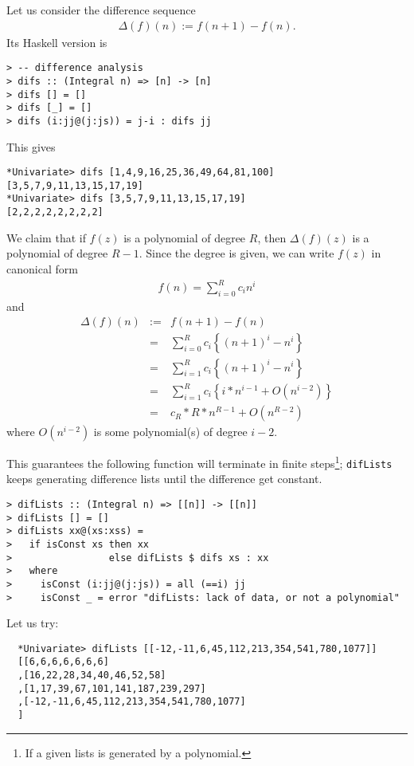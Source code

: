 \documentclass[11pt]{book}
\begin{document}
Let us consider the difference sequence
\begin{eqnarray}
\label{difference}
\Delta(f) (n) := f(n+1) - f(n).
\end{eqnarray}
Its Haskell version is
\begin{verbatim}
> -- difference analysis
> difs :: (Integral n) => [n] -> [n]
> difs [] = []
> difs [_] = []
> difs (i:jj@(j:js)) = j-i : difs jj
\end{verbatim}
This gives
\begin{verbatim}
*Univariate> difs [1,4,9,16,25,36,49,64,81,100]
[3,5,7,9,11,13,15,17,19]
*Univariate> difs [3,5,7,9,11,13,15,17,19]
[2,2,2,2,2,2,2,2]
\end{verbatim}

We claim that if $f(z)$ is a polynomial of degree $R$, then $\Delta(f)(z)$ is a polynomial of degree $R-1$.
Since the degree is given, we can write $f(z)$ in canonical form
\begin{eqnarray}
f(n) = \sum_{i=0}^R c_i n^i
\end{eqnarray}
and
\begin{eqnarray}
\Delta(f)(n) &:=& f(n+1) - f(n) \\
&=& \sum_{i=0}^R c_i \left\{ (n+1)^i - n^i\right\} \\
&=& \sum_{i=1}^R c_i \left\{ (n+1)^i - n^i\right\} \\
&=& \sum_{i=1}^R c_i \left\{ i*n^{i-1} + O(n^{i-2}) \right\} \\
&=& c_R*R*n^{R-1} + O(n^{R-2})
\end{eqnarray}
where $O(n^{i-2})$ is some polynomial(s) of degree $i-2$.

This guarantees the following function will terminate in finite steps\footnote{
If a given lists is generated by a polynomial.
}; \texttt{difLists} keeps generating difference lists until the difference get constant.
\begin{verbatim}
> difLists :: (Integral n) => [[n]] -> [[n]]
> difLists [] = []
> difLists xx@(xs:xss) =
>   if isConst xs then xx
>                 else difLists $ difs xs : xx
>   where
>     isConst (i:jj@(j:js)) = all (==i) jj
>     isConst _ = error "difLists: lack of data, or not a polynomial"
\end{verbatim}
Let us try:
\begin{verbatim}
  *Univariate> difLists [[-12,-11,6,45,112,213,354,541,780,1077]]
  [[6,6,6,6,6,6,6]
  ,[16,22,28,34,40,46,52,58]
  ,[1,17,39,67,101,141,187,239,297]
  ,[-12,-11,6,45,112,213,354,541,780,1077]
  ]
\end{verbatim}
\end{document}
